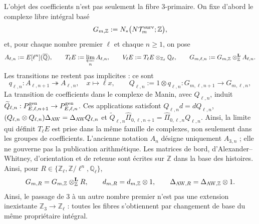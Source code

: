 L'objet des coefficients n'est pas seulement la fibre $3$-primaire. On fixe d'abord
le complexe libre intégral basé
\begin{equation}\label{eq:pdf2-bsd-gmz}
 G_{m,\mathbb Z}:=N_*\bigl(N\mathcal T_m^{\rm surv};\mathbb Z\bigr),
\end{equation}
et, pour chaque nombre premier $\ell$ et chaque $n\geq1$, on pose
\begin{equation}\label{eq:pdf2-bsd-coeficientes-todos-ell}
 A_{\ell,n}:=E[\ell^n](\overline{\mathbb Q}),\qquad
 T_\ell E:=\varprojlim_nA_{\ell,n},\qquad
 V_\ell E:=T_\ell E\otimes_{\mathbb Z_\ell}\mathbb Q_\ell,
 \qquad
 G_{m,\ell,n}:=G_{m,\mathbb Z}\otimes_{\mathbb Z}^{\mathbf L}A_{\ell,n}.
\end{equation}
Les transitions ne restent pas implicites : ce sont
\begin{equation}\label{eq:pdf2-bsd-transiciones-ell-n}
 q_{\ell,n}:A_{\ell,n+1}\twoheadrightarrow A_{\ell,n},
 \quad x\longmapsto\ell x,
 \qquad
 Q_{\ell,n}:=1\otimes q_{\ell,n}:G_{m,\ell,n+1}\to G_{m,\ell,n},
\end{equation}
La transition de coefficients dans le complexe de Manin, avec
$Q_{\ell,n}$, induit
$\widetilde Q_{\ell,n}:P_{E,\ell,n+1}^{\rm gen}\to
P_{E,\ell,n}^{\rm gen}$. Ces applications satisfont
$Q_{\ell,n}d=dQ_{\ell,n}$,
$(Q_{\ell,n}\otimes Q_{\ell,n})\Delta_{\rm AW}
=\Delta_{\rm AW}Q_{\ell,n}$ et
$\widetilde Q_{\ell,n}\widehat\Pi_{0,\ell,n+1}
=\widehat\Pi_{0,\ell,n}Q_{\ell,n}$. Ainsi, la limite qui définit $T_\ell E$
est prise dans la même famille de complexes, non seulement dans les groupes de
coefficients.
L'ancienne notation $A_n$ désigne uniquement
$A_{3,n}$ ; elle ne gouverne pas la publication arithmétique. Les matrices de bord,
d'Alexander--Whitney, d'orientation et de retenue sont écrites sur $\mathbb Z$ dans
la base des histoires. Ainsi, pour
$R\in\{\mathbb Z_\ell,\mathbb Z/\ell^n,\mathbb Q_\ell\}$,
\begin{equation}\label{eq:pdf2-bsd-base-change-integral}
 G_{m,R}=G_{m,\mathbb Z}\otimes_{\mathbb Z}^{\mathbf L}R,
 \qquad
 d_{m,R}=d_{m,\mathbb Z}\otimes1,
 \qquad
 \Delta_{{\rm AW},R}=\Delta_{{\rm AW},\mathbb Z}\otimes1.
\end{equation}
Ainsi, le passage de $3$ à un autre nombre premier n'est pas une extension inexistante
$\mathbb Z_3\to\mathbb Z_\ell$ : toutes les fibres s'obtiennent par changement de
base du même propriétaire intégral.

